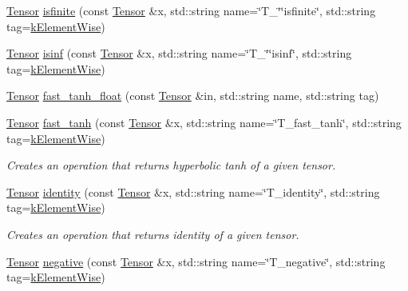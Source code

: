 \begin{DoxyCompactItemize}
\item 
\hyperlink{classtvm_1_1te_1_1Tensor}{Tensor} \hyperlink{namespacetopi_a4568b2a7240a100189b391e2f968ccc5}{isfinite} (const \hyperlink{classtvm_1_1te_1_1Tensor}{Tensor} \&x, std\+::string name=\char`\"{}T\+\_\+\char`\"{}\char`\"{}isfinite\char`\"{}, std\+::string tag=\hyperlink{namespacetopi_ac1b34ed59d38a5f5338bee6b2cad42be}{k\+Element\+Wise})
\item 
\hyperlink{classtvm_1_1te_1_1Tensor}{Tensor} \hyperlink{namespacetopi_a28ca1863f504edc2e0f8865ca608569e}{isinf} (const \hyperlink{classtvm_1_1te_1_1Tensor}{Tensor} \&x, std\+::string name=\char`\"{}T\+\_\+\char`\"{}\char`\"{}isinf\char`\"{}, std\+::string tag=\hyperlink{namespacetopi_ac1b34ed59d38a5f5338bee6b2cad42be}{k\+Element\+Wise})
\item 
\hyperlink{classtvm_1_1te_1_1Tensor}{Tensor} \hyperlink{namespacetopi_a1cfb51ba097f0249f1f81d03bdd52fe2}{fast\+\_\+tanh\+\_\+float} (const \hyperlink{classtvm_1_1te_1_1Tensor}{Tensor} \&in, std\+::string name, std\+::string tag)
\item 
\hyperlink{classtvm_1_1te_1_1Tensor}{Tensor} \hyperlink{namespacetopi_ae013a4d1c692ba974eb4c49d53b1a7fe}{fast\+\_\+tanh} (const \hyperlink{classtvm_1_1te_1_1Tensor}{Tensor} \&x, std\+::string name=\char`\"{}T\+\_\+fast\+\_\+tanh\char`\"{}, std\+::string tag=\hyperlink{namespacetopi_ac1b34ed59d38a5f5338bee6b2cad42be}{k\+Element\+Wise})
\begin{DoxyCompactList}\small\item\em Creates an operation that returns hyperbolic tanh of a given tensor. \end{DoxyCompactList}\item 
\hyperlink{classtvm_1_1te_1_1Tensor}{Tensor} \hyperlink{namespacetopi_a4f5a29ac302ac31ce75e65f21ad60d41}{identity} (const \hyperlink{classtvm_1_1te_1_1Tensor}{Tensor} \&x, std\+::string name=\char`\"{}T\+\_\+identity\char`\"{}, std\+::string tag=\hyperlink{namespacetopi_ac1b34ed59d38a5f5338bee6b2cad42be}{k\+Element\+Wise})
\begin{DoxyCompactList}\small\item\em Creates an operation that returns identity of a given tensor. \end{DoxyCompactList}\item 
\hyperlink{classtvm_1_1te_1_1Tensor}{Tensor} \hyperlink{namespacetopi_a9953d63728137b5bba2ef2832963e411}{negative} (const \hyperlink{classtvm_1_1te_1_1Tensor}{Tensor} \&x, std\+::string name=\char`\"{}T\+\_\+negative\char`\"{}, std\+::string tag=\hyperlink{namespacetopi_ac1b34ed59d38a5f5338bee6b2cad42be}{k\+Element\+Wise})

\end{DoxyCompactItemize}
